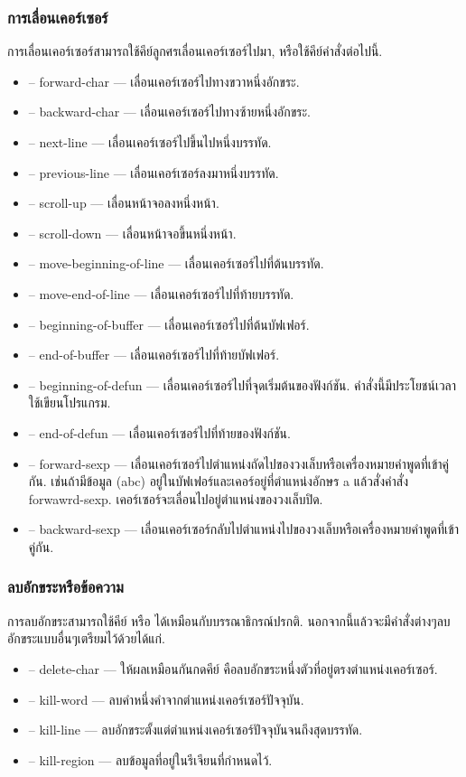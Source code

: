 \begin{thwbr}
\subsubsection{การเลื่อนเคอร์เซอร์}
การเลื่อนเคอร์เซอร์สามารถใช้คีย์ลูกศรเลื่อนเคอร์เซอร์ไปมา, หรือใช้คีย์คำสั่งต่อไปนี้.
\begin{itemize}
\item {} -- forward-char --- เลื่อนเคอร์เซอร์ไปทางขวาหนึ่งอักขระ.
\item {} -- backward-char --- เลื่อนเคอร์เซอร์ไปทางซ้ายหนึ่งอักขระ.
\item {} -- next-line --- เลื่อนเคอร์เซอร์ไปขึ้นไปหนึ่งบรรทัด.
\item {} -- previous-line --- เลื่อนเคอร์เซอร์ลงมาหนึ่งบรรทัด.
\item {} -- scroll-up --- เลื่อนหน้าจอลงหนึ่งหน้า.
\item {} -- scroll-down --- เลื่อนหน้าจอขึ้นหนึ่งหน้า.
\item {} -- move-beginning-of-line --- เลื่อนเคอร์เซอร์ไปที่ต้นบรรทัด.
\item {} -- move-end-of-line --- เลื่อนเคอร์เซอร์ไปที่ท้ายบรรทัด.
\item {} -- beginning-of-buffer --- เลื่อนเคอร์เซอร์ไปที่ต้นบัฟเฟอร์.
\item {} -- end-of-buffer --- เลื่อนเคอร์เซอร์ไปที่ท้ายบัฟเฟอร์.
\item {} -- beginning-of-defun --- เลื่อนเคอร์เซอร์ไปที่จุดเริ่มต้นของฟังก์ชัน. คำสั่งนี้มีประโยชน์เวลาใช้เขียนโปรแกรม.
\item {} -- end-of-defun --- เลื่อนเคอร์เซอร์ไปที่ท้ายของฟังก์ชัน.
\item {} -- forward-sexp --- เลื่อนเคอร์เซอร์ไปตำแหน่งถัดไปของวงเล็บหรือเครื่องหมายคำพูดที่เข้าคู่กัน. เช่นถ้ามีข้อมูล (abc) อยู่ในบัฟเฟอร์และเคอร์อยู่ที่ตำแหน่งอักษร a แล้วสั่งคำสั่ง forwawrd-sexp. เคอร์เซอร์จะเลื่อนไปอยู่ตำแหน่งของวงเล็บปิด.
\item {} -- backward-sexp --- เลื่อนเคอร์เซอร์กลับไปตำแหน่งไปของวงเล็บหรือเครื่องหมายคำพูดที่เข้าคู่กัน. 
\end{itemize}

\subsubsection{ลบอักขระหรือข้อความ}
การลบอักขระสามารถใช้คีย์  หรือ  ได้เหมือนกับบรรณาธิกรณ์ปรกติ. นอกจากนี้แล้วจะมีคำสั่งต่างๆลบอักขระแบบอื่นๆเตรียมไว้ด้วยได้แก่.
\begin{itemize}
\item {} -- delete-char --- ให้ผลเหมือนกันกดคีย์  คือลบอักขระหนึ่งตัวที่อยู่ตรงตำแหน่งเคอร์เซอร์. 
\item {} -- kill-word --- ลบคำหนึ่งคำจากตำแหน่งเคอร์เซอร์ปัจจุบัน.
\item {} -- kill-line --- ลบอักขระตั้งแต่ตำแหน่งเคอร์เซอร์ปัจจุบันจนถึงสุดบรรทัด.
\item {} -- kill-region --- ลบข้อมูลที่อยู่ในรีเจียนที่กำหนดไว้.
\end{itemize}



\end{thwbr}
